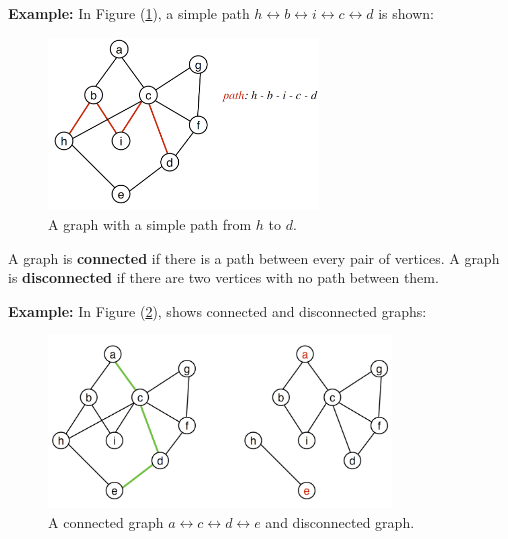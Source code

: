 \noindent
\textbf{Example:} In Figure (\ref{fig:path_graph}), a simple path $h\leftrightarrow b \leftrightarrow i \leftrightarrow c \leftrightarrow d$ is shown:\\
\begin{figure}[h]
    \begin{center}
      \includegraphics[height=1.8in]{./Sections/graphs/path_graph.png}
    \end{center}
     \caption{A graph with a simple path from $h$ to $d$.}\label{fig:path_graph}
  \end{figure}

\begin{Def}[Connectivity]

    A graph is \textbf{connected} if there is a path between every pair of vertices. 
    A graph is \textbf{disconnected} if there are two vertices with no path between them.
\end{Def}
\textbf{Example:} In Figure (\ref{fig:con_graph}), shows connected and disconnected graphs:\\
\begin{figure}[h]
    \begin{center}
      \includegraphics[height=1.8in]{./Sections/graphs/con_graph.png}
    \end{center}
     \caption{A connected graph $a\leftrightarrow c \leftrightarrow d \leftrightarrow e$  and disconnected graph.}\label{fig:con_graph}
  \end{figure}
  



